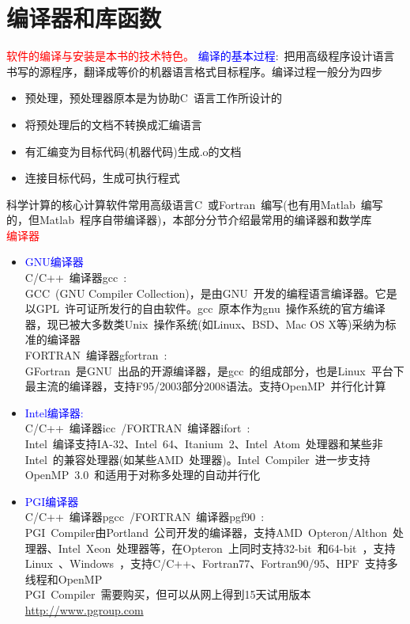 \documentclass{article}      %
\begin{document}
\section{编译器和库函数}
\textcolor{red}{软件的编译与安装是本书的技术特色。}
\textcolor{blue}{编译的基本过程}:~把用高级程序设计语言书写的源程序，翻译成等价的机器语言格式目标程序。编译过程一般分为四步
\begin{itemize}
	\item 预处理，预处理器原本是为协助\textrm{C~}语言工作所设计的
	\item 将预处理后的文档不转换成汇编语言
	\item 有汇编变为目标代码(机器代码)生成.o的文档
	\item 连接目标代码，生成可执行程式
\end{itemize}
科学计算的核心计算软件常用高级语言\textrm{C~}或\textrm{Fortran~}编写(也有用\textrm{Matlab~}编写的，但\textrm{Matlab~}程序自带编译器)，本部分分节介绍最常用的编译器和数学库\\
\textcolor{red}{编译器}
\begin{itemize}
	\item \textcolor{blue}{GNU编译器}\\
		\textrm{C/C++~}编译器\textrm{gcc~}:\\
		\textrm{GCC~(GNU Compiler Collection)}，是由\textrm{GNU~}开发的编程语言编译器。它是以\textrm{GPL~}许可证所发行的自由软件。\textrm{gcc~}原本作为\textrm{gnu~}操作系统的官方编译器，现已被大多数类\textrm{Unix~}操作系统(如\textrm{Linux}、\textrm{BSD}、\textrm{Mac OS X}等)采纳为标准的编译器\\
		FORTRAN~编译器\textrm{gfortran~}:\\
		\textrm{GFortran~}是\textrm{GNU~}出品的开源编译器，是\textrm{gcc~}的组成部分，也是\textrm{Linux~}平台下最主流的编译器，支持\textrm{F95/2003}部分2008语法。支持\textrm{OpenMP~}并行化计算
	\item \textcolor{blue}{Intel编译器:}\\
		\textrm{C/C++~}编译器\textrm{icc~}/\textrm{FORTRAN~}编译器\textrm{ifort~}:\\
		\textrm{Intel~}编译支持\textrm{IA-32}、\textrm{Intel~64}、\textrm{Itanium~2}、\textrm{Intel~Atom~}处理器和某些非\textrm{Intel~}的兼容处理器(如某些\textrm{AMD~}处理器)。\textrm{Intel~Compiler~}进一步支持\textrm{OpenMP~3.0~}和适用于对称多处理的自动并行化
	\item \textcolor{blue}{PGI编译器}\\
		C/C++~编译器\textrm{pgcc~}/FORTRAN~编译器\textrm{pgf90~}:\\
		\textrm{PGI~Compiler}由\textrm{Portland~}公司开发的编译器，支持\textrm{AMD~Opteron}/\textrm{Althon~}处理器、\textrm{Intel~Xeon~}处理器等，在\textrm{Opteron~}上同时支持\textrm{32-bit~}和\textrm{64-bit~}，支持\textrm{Linux~}、\textrm{Windows~}，支持\textrm{C/C++}、\textrm{Fortran77}、\textrm{Fortran90/95}、\textrm{HPF~}支持多线程和\textrm{OpenMP~}\\
		\textrm{PGI~Compiler~}需要购买，但可以从网上得到15天试用版本\url{http://www.pgroup.com}
\end{itemize}
\end{document}
